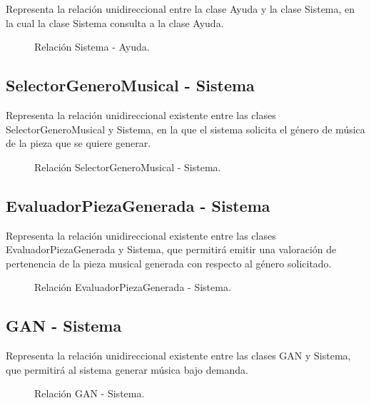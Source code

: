 Representa la relación unidireccional entre la clase Ayuda y la
clase Sistema, en la cual la clase Sistema consulta a la clase
Ayuda.

\begin{figure}[H]
  \centering
  
  \caption{Relación Sistema - Ayuda.}
\end{figure}

\subsection{SelectorGeneroMusical - Sistema}

Representa la relación unidireccional existente entre las clases SelectorGeneroMusical y Sistema, en la que el sistema solicita el género de música de la pieza que se quiere generar.

\begin{figure}[H]
  \centering
  
  \caption{Relación SelectorGeneroMusical - Sistema.}
\end{figure}

\subsection{EvaluadorPiezaGenerada - Sistema}

Representa la relación unidireccional existente entre las clases EvaluadorPiezaGenerada y Sistema, que permitirá emitir una valoración de pertenencia de la pieza musical generada con respecto al género solicitado.

\begin{figure}[H]
  \centering
  
  \caption{Relación EvaluadorPiezaGenerada - Sistema.}
\end{figure}

\subsection{GAN - Sistema}

Representa la relación unidireccional existente entre las clases GAN y Sistema, que permitirá al sistema generar música bajo demanda.

\begin{figure}[H]
  \centering
  
  \caption{Relación GAN - Sistema.}
\end{figure}

